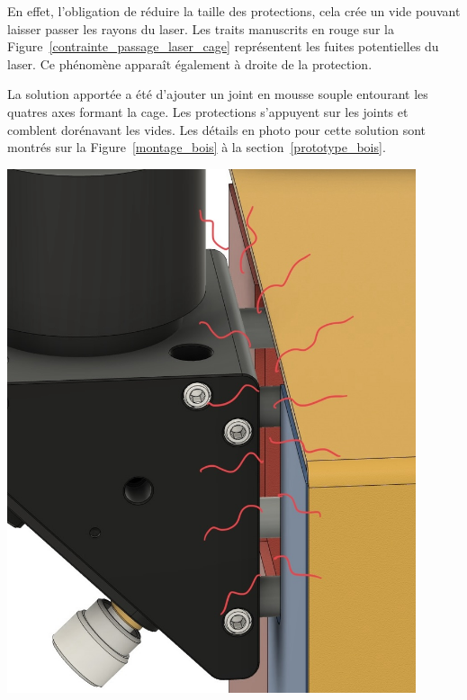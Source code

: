 \begin{minipage}[c]{0.5\textwidth}
    En effet, l'obligation de réduire la taille des protections, cela crée un vide pouvant laisser passer les rayons du laser. Les traits manuscrits en rouge sur la Figure~\ref{contrainte_passage_laser_cage} représentent les fuites potentielles du laser. Ce phénomène apparaît également à droite de la protection.

    La solution apportée a été d'ajouter un joint en mousse souple entourant les quatres axes formant la cage. Les protections s'appuyent sur les joints et comblent dorénavant les vides. Les détails en photo pour cette solution sont montrés sur la Figure~\ref{montage_bois} à la section~\ref{prototype_bois}.
\end{minipage}\hfill
\begin{minipage}[c]{0.48\textwidth}
    \begin{center}
        \includegraphics[width=0.9\textwidth]{assets/figures/Protections_laser/Securite_mecanique/Protection_entree_laser/contrainte_passage_laser_cage.jpeg}
    \end{center}
    \label{contrainte_passage_laser_cage}
\end{minipage}

